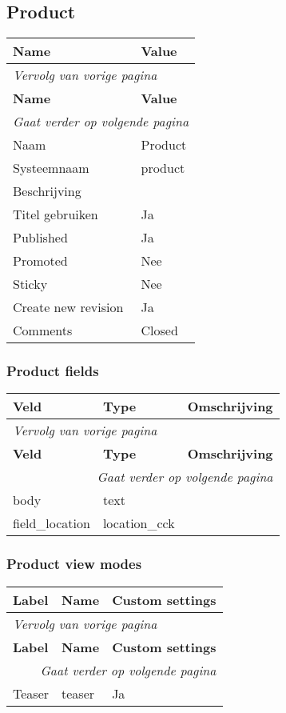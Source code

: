 \subsection{Product}
\label{sec:content-product}
  \begin{longtable}{| p{7.50cm}|p{7.50cm}|}
  \hline
  \rowcolor{tableheader}
  \textbf{Name} & \textbf{Value}  \tabularnewline
  \hline
\endfirsthead
\multicolumn{2}{l}{\textit{Vervolg van vorige pagina}} \\
\hline
\rowcolor{tableheader}
  \textbf{Name} & \textbf{Value}  \tabularnewline
  \hline
\hline
\endhead
\multicolumn{2}{r}{\textit{Gaat verder op volgende pagina}} \\
\endfoot
\hline
\endlastfoot
  Naam & Product  \tabularnewline
  \hline
  Systeemnaam & product  \tabularnewline
  \hline
  Beschrijving &   \tabularnewline
  \hline
  Titel gebruiken & Ja  \tabularnewline
  \hline
  Published & Ja  \tabularnewline
  \hline
  Promoted & Nee  \tabularnewline
  \hline
  Sticky & Nee  \tabularnewline
  \hline
  Create new revision & Ja  \tabularnewline
  \hline
  Comments & Closed  \tabularnewline
  \hline
  \end{longtable}

\subsubsection{Product fields}
  \begin{longtable}{| p{5.00cm}|p{5.00cm}|p{5.00cm}|}
  \hline
  \rowcolor{tableheader}
  \textbf{Veld} & \textbf{Type} & \textbf{Omschrijving}  \tabularnewline
  \hline
\endfirsthead
\multicolumn{3}{l}{\textit{Vervolg van vorige pagina}} \\
\hline
\rowcolor{tableheader}
  \textbf{Veld} & \textbf{Type} & \textbf{Omschrijving}  \tabularnewline
  \hline
\hline
\endhead
\multicolumn{3}{r}{\textit{Gaat verder op volgende pagina}} \\
\endfoot
\hline
\endlastfoot
  body & text &   \tabularnewline
  \hline
  field\_location & location\_cck &   \tabularnewline
  \hline
  \end{longtable}

\subsubsection{Product view modes}
  \begin{longtable}{| p{5.00cm}|p{5.00cm}|p{5.00cm}|}
  \hline
  \rowcolor{tableheader}
  \textbf{Label} & \textbf{Name} & \textbf{Custom settings}  \tabularnewline
  \hline
\endfirsthead
\multicolumn{3}{l}{\textit{Vervolg van vorige pagina}} \\
\hline
\rowcolor{tableheader}
  \textbf{Label} & \textbf{Name} & \textbf{Custom settings}  \tabularnewline
  \hline
\hline
\endhead
\multicolumn{3}{r}{\textit{Gaat verder op volgende pagina}} \\
\endfoot
\hline
\endlastfoot
  Teaser & teaser & Ja  \tabularnewline
  \hline
  \end{longtable}

